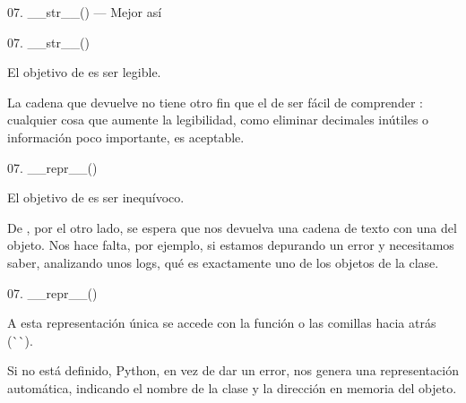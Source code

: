 \begin{frame}{07. \_\_str\_\_() — Mejor así}
  \scriptsize
\end{frame}

\begin{frame}{07. \_\_str\_\_()}
  \begin{alertblock}{}
    \Large
    \centering
    El objetivo de  es ser legible.
  \end{alertblock}

  \begin{center}
    La cadena que devuelve  no tiene otro fin que el
    de ser fácil de comprender : cualquier cosa
    que aumente la legibilidad, como eliminar decimales inútiles o
    información poco importante, es aceptable.
  \end{center}
\end{frame}

\begin{frame}{07. \_\_repr\_\_()}
  \begin{alertblock}{}
    \large
    \centering
    El objetivo de  es ser inequívoco.
  \end{alertblock}

  \begin{center}
    De , por el otro lado, se espera que nos
    devuelva una cadena de texto con una  del objeto. Nos hace falta, por ejemplo, si estamos
    depurando un error y necesitamos saber, analizando unos logs, qué
    es exactamente uno de los objetos de la clase.
  \end{center}
\end{frame}

\begin{frame}{07. \_\_repr\_\_()}
  \begin{block}{}
    \large
    \centering
    A esta representación única se accede con la función
     o las comillas hacia atrás (\`{}\`{}).
  \end{block}

  \begin{center}
    \small
    Si  no está definido, Python, en vez de
    dar un error, nos genera una representación automática, indicando
    el nombre de la clase y la dirección en memoria del objeto.
  \end{center}
\end{frame}


